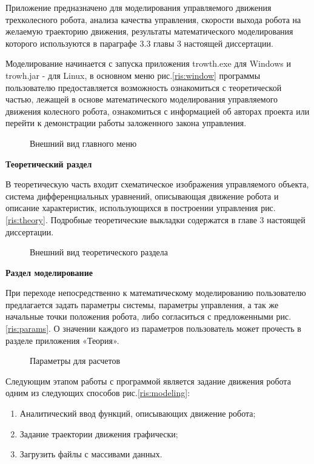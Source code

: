 Приложение предназначено для моделирования управляемого движения трехколесного робота, анализа качества управления, скорости выхода робота на желаемую траекторию движения, результаты математического моделирования которого используются в параграфе 3.3 главы 3 настоящей диссертации.

Моделирование начинается с запуска приложения trowth.exe для Windows и trowh.jar - для Linux, в основном меню рис.\eqref{ris:window} программы пользователю предоставляется возможность ознакомиться с теоретической частью, лежащей в основе математического моделирования управляемого движения колесного робота, ознакомиться с информацией об авторах проекта или перейти к демонстрации работы заложенного закона управления. 

\begin{figure}[h]
\caption{Внешний вид главного меню}
\label{ris:window}
\end{figure}

\par
\textbf{Теоретический раздел}

В теоретическую часть входит схематическое изображения управляемого объекта, система дифференциальных уравнений, описывающая движение робота и описание характеристик, использующихся в построении управления рис.\eqref{ris:theory}. 
Подробные теоретические выкладки содержатся в главе 3 настоящей  диссертации.
\nopagebreak[4]
\begin{figure}[h]
\caption{Внешний вид теоретического раздела}
\label{ris:theory}
\end{figure} 

\par
\textbf{Раздел моделирование}

При переходе непосредственно к математическому моделированию пользователю предлагается задать параметры системы, параметры управления, а так же начальные точки положения робота, либо согласиться с предложенными рис.\eqref{ris:params}. О значении каждого из параметров пользователь может прочесть в разделе приложения «Теория».

\begin{figure}[h]
\caption{Параметры для расчетов}
\label{ris:params}
\end{figure} 

Следующим этапом работы с программой является задание движения робота одним из следующих способов рис.\eqref{ris:modeling}:
\begin{enumerate}
\item{Аналитический ввод функций, описывающих движение робота;}
\item{Задание траектории движения графически;}
\item{Загрузить файлы с массивами данных.}
\end{enumerate}

